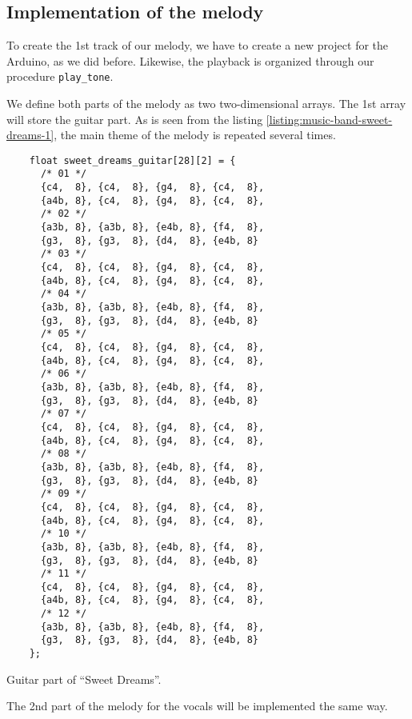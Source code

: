 \documentclass[../sparc.tex]{subfiles}
\begin{document}
\newpage
\subsection{Implementation of the melody}

To create the 1st track of our melody, we have to create a new project for the
Arduino, as we did before.  Likewise, the playback is organized through our
procedure \texttt{play\_tone}.

We define both parts of the melody as two two-dimensional arrays.  The 1st array
will store the guitar part.  As is seen from the listing
\ref{listing:music-band-sweet-dreams-1}, the main theme of the melody is
repeated several times.

\begin{listing}[H]
  \begin{verbatim}
    float sweet_dreams_guitar[28][2] = {
      /* 01 */
      {c4,  8}, {c4,  8}, {g4,  8}, {c4,  8},
      {a4b, 8}, {c4,  8}, {g4,  8}, {c4,  8},
      /* 02 */
      {a3b, 8}, {a3b, 8}, {e4b, 8}, {f4,  8},
      {g3,  8}, {g3,  8}, {d4,  8}, {e4b, 8}
      /* 03 */
      {c4,  8}, {c4,  8}, {g4,  8}, {c4,  8},
      {a4b, 8}, {c4,  8}, {g4,  8}, {c4,  8},
      /* 04 */
      {a3b, 8}, {a3b, 8}, {e4b, 8}, {f4,  8},
      {g3,  8}, {g3,  8}, {d4,  8}, {e4b, 8}
      /* 05 */
      {c4,  8}, {c4,  8}, {g4,  8}, {c4,  8},
      {a4b, 8}, {c4,  8}, {g4,  8}, {c4,  8},
      /* 06 */
      {a3b, 8}, {a3b, 8}, {e4b, 8}, {f4,  8},
      {g3,  8}, {g3,  8}, {d4,  8}, {e4b, 8}
      /* 07 */
      {c4,  8}, {c4,  8}, {g4,  8}, {c4,  8},
      {a4b, 8}, {c4,  8}, {g4,  8}, {c4,  8},
      /* 08 */
      {a3b, 8}, {a3b, 8}, {e4b, 8}, {f4,  8},
      {g3,  8}, {g3,  8}, {d4,  8}, {e4b, 8}
      /* 09 */
      {c4,  8}, {c4,  8}, {g4,  8}, {c4,  8},
      {a4b, 8}, {c4,  8}, {g4,  8}, {c4,  8},
      /* 10 */
      {a3b, 8}, {a3b, 8}, {e4b, 8}, {f4,  8},
      {g3,  8}, {g3,  8}, {d4,  8}, {e4b, 8}
      /* 11 */
      {c4,  8}, {c4,  8}, {g4,  8}, {c4,  8},
      {a4b, 8}, {c4,  8}, {g4,  8}, {c4,  8},
      /* 12 */
      {a3b, 8}, {a3b, 8}, {e4b, 8}, {f4,  8},
      {g3,  8}, {g3,  8}, {d4,  8}, {e4b, 8}
    };
  \end{verbatim}
  \caption{Guitar part of ``Sweet Dreams''.}
  \label{listing:music-band-sweet-dreams-1}
\end{listing}

The 2nd part of the melody for the vocals will be implemented the same way.
\end{document}
